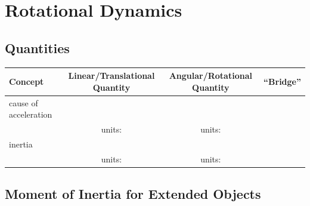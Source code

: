 \documentclass[10pt]{exam}
\begin{document}
\pagebreak \hfill \pagebreak

\section*{Rotational Dynamics}

\subsection*{Quantities}

\renewcommand{\arraystretch}{2}

\begin{tabular}{p{9em}ccp{6.5em}}
  Concept & Linear/Translational Quantity & Angular/Rotational Quantity & \hfill ``Bridge'' \\ \hline\hline
  cause of acceleration \\[1em] & units: & units:  \\\hline
  inertia \\[1em] & units: & units:  \\\hline
\end{tabular}

\vs

\subsection*{Moment of Inertia for Extended Objects}
\end{document}
